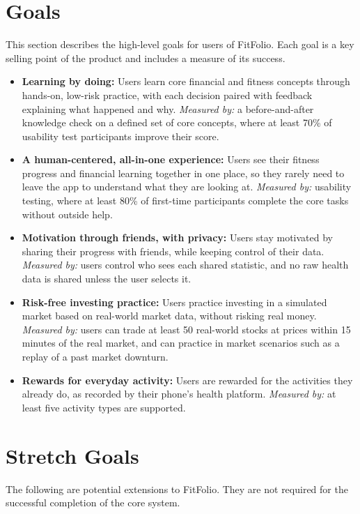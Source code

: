 \documentclass{article}
\begin{document}
\section{Goals}
This section describes the high-level goals for users of FitFolio. Each goal is a key selling point of the product and includes a measure of its success.
\begin{itemize}
    \item \textbf{Learning by doing:} Users learn core financial and fitness concepts through hands-on, low-risk practice, with each decision paired with feedback explaining what happened and why. \textit{Measured by:} a before-and-after knowledge check on a defined set of core concepts, where at least 70\% of usability test participants improve their score.
    \item \textbf{A human-centered, all-in-one experience:} Users see their fitness progress and financial learning together in one place, so they rarely need to leave the app to understand what they are looking at. \textit{Measured by:} usability testing, where at least 80\% of first-time participants complete the core tasks without outside help.
    \item \textbf{Motivation through friends, with privacy:} Users stay motivated by sharing their progress with friends, while keeping control of their data. \textit{Measured by:} users control who sees each shared statistic, and no raw health data is shared unless the user selects it.
    \item \textbf{Risk-free investing practice:} Users practice investing in a simulated market based on real-world market data, without risking real money. \textit{Measured by:} users can trade at least 50 real-world stocks at prices within 15 minutes of the real market, and can practice in market scenarios such as a replay of a past market downturn.
    \item \textbf{Rewards for everyday activity:} Users are rewarded for the activities they already do, as recorded by their phone's health platform. \textit{Measured by:} at least five activity types are supported.
\end{itemize}
\section{Stretch Goals}\label{sec:stretch-goals}

The following are potential extensions to FitFolio. 
They are not required for the successful completion of the core system.
\end{document}
